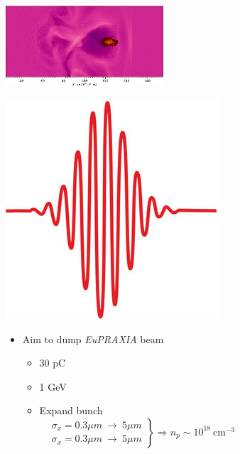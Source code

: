 \documentclass[8pt]{beamer}
\begin{document}
\begin{frame}[t]
\begin{flushright}\includegraphics[height=3cm]{frame1}\end{flushright}

\vspace{-174pt}\hspace{125pt}\includegraphics[scale=0.13]{laserpulse}\linebreak
\vfill \begin{flushright}
\begin{minipage}{0.51\textwidth}
\begin{itemize}
\item Aim to dump \textit{EuPRAXIA} beam
\begin{itemize}
\item 30 pC
\item 1 GeV
\item Expand bunch \\
$\left.\begin{aligned}
&\sigma_{x}=0.3 \mu m ~\to~5\mu m\\
&\sigma_{x}=0.3 \mu m ~\to~5\mu m
\end{aligned}\right\} \Rightarrow n_p\sim10^{18}~\text{cm}^{-3}$ 
\end{itemize}
\end{itemize}
\end{minipage}
\end{flushright}


\end{frame}
\end{document}
